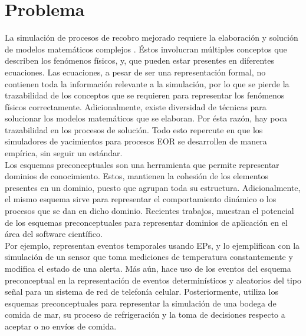 
\section{Problema}

La simulación de procesos de recobro mejorado requiere la elaboración y solución de modelos matemáticos complejos \citep{ertekin2001basic}. Éstos involucran múltiples conceptos que describen los fenómenos físicos, y, que pueden estar presentes en diferentes ecuaciones. Las ecuaciones, a pesar de ser una representación formal, no contienen toda la información relevante a la simulación, por lo que se pierde la trazabilidad de los conceptos que se requieren para representar los fenómenos físicos correctamente. Adicionalmente, existe diversidad de técnicas para solucionar los modelos matemáticos que se elaboran. Por ésta razón, hay poca trazabilidad en los procesos de solución. Todo esto repercute en que los simuladores de yacimientos para procesos EOR se desarrollen de manera empírica, sin seguir un estándar.\\

Los esquemas preconceptuales son una herramienta que permite representar dominios de conocimiento. Estos, mantienen la cohesión de los elementos presentes en un dominio, puesto que agrupan toda su estructura. Adicionalmente, el mismo esquema sirve para representar el comportamiento dinámico o los procesos que se dan en dicho dominio. Recientes trabajos, muestran el potencial de los esquemas preconceptuales para representar dominios de aplicación en el área del software científico.\\

Por ejemplo, \cite{norena2018timrep} representan eventos temporales usando EPs, y lo ejemplifican con la simulación de un sensor que toma mediciones de temperatura constantemente y modifica el estado de una alerta. Más aún, \cite{norena2018det} hace uso de los eventos del esquema preconceptual en la representación de eventos determinísticos y aleatorios del tipo señal para un sistema de red de telefonía celular. Posteriormente, \cite{norena2018bs} utiliza los esquemas preconceptuales para representar la simulación de una bodega de comida de mar, su proceso de refrigeración y la toma de decisiones respecto a aceptar o no envíos de comida.\\

